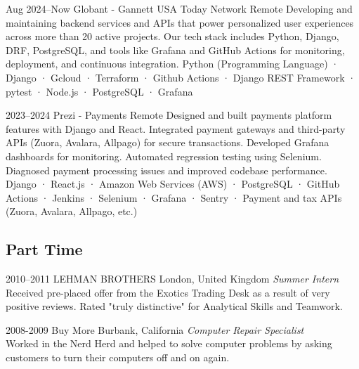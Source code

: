 \documentclass[a4paper,nocolors]{cv-friggeri-x}
\begin{document}
\begin{entrylist}


\entryexperience
{Aug 2024--Now}
{Globant - Gannett USA Today Network }
{Remote}
{Developing and maintaining backend services and APIs that power personalized user experiences across more than 20 active projects. Our tech stack includes Python, Django, DRF, PostgreSQL, and tools like Grafana and GitHub Actions for monitoring, deployment, and continuous integration.}
{Python (Programming Language) · Django · Gcloud · Terraform · Github Actions · Django REST Framework · pytest · Node.js · PostgreSQL · Grafana}


\entryexperience
{2023--2024}
{Prezi - Payments }
{Remote}
{Designed and built payments platform features with Django and React. Integrated payment gateways and third-party APIs (Zuora, Avalara, Allpago) for secure transactions. Developed Grafana dashboards for monitoring. Automated regression testing using Selenium. Diagnosed payment processing issues and improved codebase performance.}
{Django · React.js · Amazon Web Services (AWS) · PostgreSQL · GitHub Actions · Jenkins · Selenium · Grafana · Sentry · Payment and tax APIs (Zuora, Avalara, Allpago, etc.)}

\end{entrylist}

\subsection{Part Time}

\begin{entrylist}

\entry
{2010--2011}
{LEHMAN BROTHERS}
{London, United Kingdom}
{\emph{Summer Intern} \\
Received pre-placed offer from the Exotics Trading Desk as a result of very positive reviews. Rated "truly distinctive" for Analytical Skills and Teamwork. \cite{test}}


\entry
{2008-2009}
{Buy More}
{Burbank, California}
{\emph{Computer Repair Specialist} \\
Worked in the Nerd Herd and helped to solve computer problems by asking customers to turn their computers off and on again.}


\end{entrylist}
\end{document}
